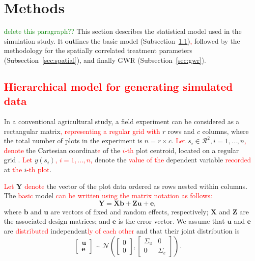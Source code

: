 \documentclass[a4paper]{article} 	%
\newcommand{\N}{\mathcal{N}}
\newcommand{\revision}[1]{\textcolor{red}{#1}}
\begin{document}
\section{Methods}\label{Sec:Meth}

\textcolor{green}{delete this paragraph??} This section describes the statistical model used in the simulation study. It outlines the basic model (S\st{ubs}ection~\ref{sec:basic})\revision{,} followed by the methodology for the spatially correlated treatment parameters (S\st{ubs}ection~\ref{sec:spatial}), and finally GWR (S\st{ubs}ection~\ref{sec:gwr}).



\subsection{\revision{Hierarchical model for generating simulated data}}\label{sec:basic}

In a conventional agricultural study, a field experiment can be considered as a rectangular matrix\revision{, representing a regular grid with} $r$ rows and $c$ columns, where the total number of plots in the experiment is $n=r\times c$. \revision{Let} $s_i\in \mathcal{R}^2, i=1,\ldots,n$\revision{,} \revision{denote} the Cartesian coordinat\revision{e} of the \revision{$i$-th} plot centroid, located on a regular grid \parencite{Zimmerman1991Randoma}. \revision{Let} $y(s_i)$\revision{, $i=1,\ldots,n$,} denote the \revision{value of the} dependent variable \revision{recorded} at \revision{the} $i$\revision{-th plot}. 
	
\revision{Let} $\bm{Y}$ \revision{denote} the vector of the plot data ordered as rows nested within columns. The \revision{basic} model \revision{can be written using the matrix notation as follows:}
\begin{equation}\label{eq:modelmatrix}
	\bm{Y} = \bm{X}\bm{b}+\bm{Z}\bm{u}+\bm{e},
\end{equation}
where $\bm{b}$ and $\bm{u}$ are vectors of fixed and random effects, respectively; $\bm{X}$ and $\bm{Z}$ are the associated design matrices; and $\bm{e}$ is the error vector. We assume that $\bm{u}$ and $\bm{e}$ are \revision{distributed} independent\revision{ly} \revision{of each other} and that their joint distribution is 
\begin{equation}\label{eq:covariance}
	\begin{bmatrix}
		\bm{u} \\ \bm{e}
	\end{bmatrix} \sim \N\left( \begin{bmatrix}
		0\\0 \end{bmatrix}, \begin{bmatrix}
		\Sigma_u & 0 \\ 0 & \Sigma_e
	\end{bmatrix}\right). 
\end{equation}
	
\end{document}
